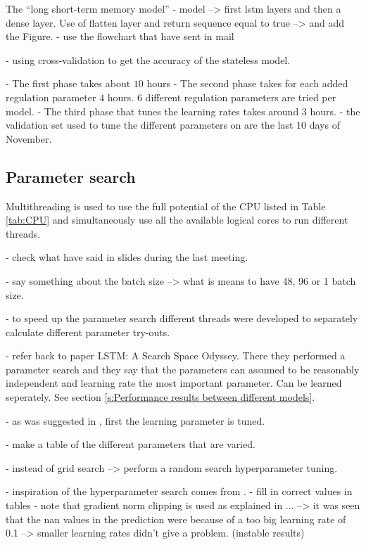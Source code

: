 The ``long short-term memory model'' 
- model --> first lstm layers and then a dense layer.
Use of flatten layer and return sequence equal to true --> \cite{Kong2019} and add the Figure.
- use the flowchart that have sent in mail


- using cross-validation to get the accuracy of the stateless model.

- The first phase takes about $ 10 $ hours
- The second phase takes for each added regulation parameter $ 4 $ hours. $ 6 $ different regulation parameters are tried per model. 
- The third phase that tunes the learning rates takes around $ 3 $ hours.
- the validation set used to tune the different parameters on are the last $ 10 $ days of November. 

\subsection{Parameter search}\label{s:Parameter search}
Multithreading is used to use the full potential of the CPU listed in Table \ref{tab:CPU} and simultaneously use all the available logical cores to run different threads. 

- check what have said in slides during the last meeting. 

- say something about the batch size --> what is means to have 48, 96 or 1 batch size. 

- to speed up the parameter search different threads were developed to separately calculate different parameter try-outs. 

- refer back to paper LSTM: A Search Space Odyssey. There they performed a parameter search and they say that the parameters can assumed to be reasonably independent and learning rate the most important parameter. Can be learned seperately. See section \ref{s:Performance results between different models}.

- as was suggested in \cite{Greff2017}, first the learning parameter is tuned. 

- make a table of the different parameters that are varied. 

- instead of grid search --> perform a random search hyperparameter tuning.

- inspiration of the hyperparameter search comes from \cite{Shi2018}.
- fill in correct values in tables
- note that gradient norm clipping is used as explained in ... --> it was seen that the nan values in the prediction were because of a too big learning rate of 0.1 --> smaller learning rates didn't give a problem. (instable results)

